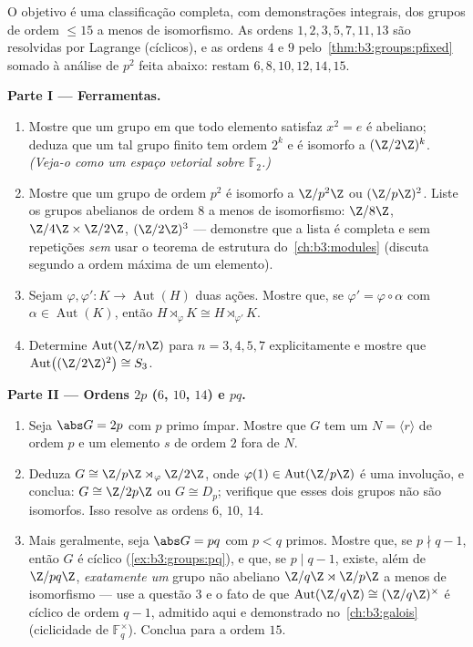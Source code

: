\begin{problem}\label{pb:b3:groups:1}
O objetivo é uma classificação completa, com demonstrações integrais,
dos grupos de ordem $\leq 15$ a menos de isomorfismo. As ordens $1, 2, 3, 5,
7, 11, 13$ são
resolvidas por Lagrange (cíclicos), e as ordens $4$ e $9$
pelo~\cref{thm:b3:groups:pfixed} somado à análise de $p^2$ feita abaixo: restam
$6, 8, 10, 12, 14, 15$.

\medskip
\noindent\textbf{Parte I --- Ferramentas.}
\begin{enumerate}
  \item Mostre que um grupo em que todo elemento satisfaz $x^2 =
        e$ é
        abeliano; deduza que um tal grupo finito tem ordem $2^k$ e
        é isomorfo a $(\Z/2\Z)^k$. \emph{(Veja-o como um espaço vetorial sobre
        $\mathbb F_2$.)}
  \item Mostre que um grupo de ordem $p^2$ é isomorfo a $\Z/p^2\Z$ ou
        $(\Z/p\Z)^2$. Liste os grupos abelianos de ordem $8$ a menos de
        isomorfismo: $\Z/8\Z$, $\Z/4\Z \times
        \Z/2\Z$, $(\Z/2\Z)^3$ --- demonstre que a
        lista é completa e sem repetições \emph{sem} usar o teorema de
        estrutura do~\cref{ch:b3:modules} (discuta segundo a ordem máxima de
        um elemento).
  \item Sejam $\varphi, \varphi' \colon K \to \operatorname{Aut}(H)$ duas ações. Mostre que, se $\varphi' = \varphi \circ
        \alpha$ com $\alpha \in \operatorname{Aut}(K)$, então
        $H
        \rtimes_{\varphi} K \cong H \rtimes_{\varphi'} K$.
  \item Determine $\operatorname{Aut}(\Z/n\Z)$ para $n = 3, 4, 5,
        7$ explicitamente e mostre que $\operatorname{Aut}\bigl((\Z/2\Z)^2
        \bigr) \cong S_3$.
\end{enumerate}

\medskip
\noindent\textbf{Parte II --- Ordens $2p$ ($6$, $10$,
$14$) e $pq$.}
\begin{enumerate}[resume]
  \item Seja $\abs G = 2p$ com $p$ primo ímpar. Mostre que $G$ tem um
         $N = \langle r \rangle$ de ordem $p$ e um elemento $s$ de
        ordem $2$ fora de $N$.
  \item Deduza $G \cong \Z/p\Z \rtimes_\varphi \Z/2\Z$, onde $\varphi(1) \in \operatorname{Aut}(\Z/p\Z)$ é uma involução, e conclua: $G \cong \Z/2p\Z$ ou
        $G \cong
        D_p$; verifique que esses dois grupos não são isomorfos. Isso
        resolve as ordens $6$, $10$, $14$.
  \item Mais geralmente, seja $\abs G = pq$ com $p < q$ primos. Mostre que,
        se $p \nmid q-1$, então $G$ é cíclico (\cref{ex:b3:groups:pq}), e que, se
        $p \mid q - 1$, existe, além de $\Z/pq\Z$, \emph{exatamente um} grupo não
        abeliano $\Z/q\Z \rtimes \Z/p\Z$ a menos de isomorfismo --- use a questão 3 e o
        fato de que $\operatorname{Aut}(\Z/q\Z) \cong
        (\Z/q\Z)^\times$ é cíclico de ordem $q - 1$, admitido aqui
        e demonstrado no~\cref{ch:b3:galois} (ciclicidade de $\mathbb F_q^\times$). Conclua
        para a ordem $15$.
\end{enumerate}


\end{problem}
